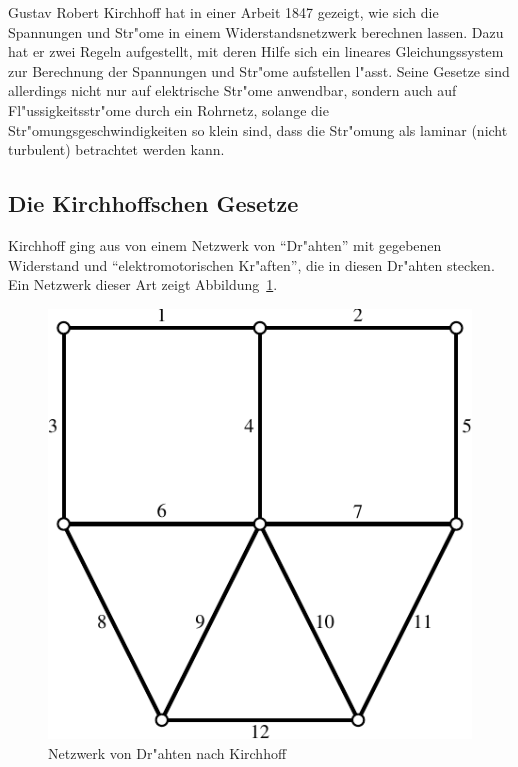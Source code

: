 %
%
Gustav Robert Kirchhoff hat in einer Arbeit 1847 gezeigt, wie sich
die Spannungen und Str"ome in einem Widerstandsnetzwerk berechnen
lassen. Dazu hat er zwei Regeln aufgestellt, mit deren Hilfe
sich ein lineares Gleichungssystem zur Berechnung der Spannungen
und Str"ome aufstellen l"asst.
Seine Gesetze sind allerdings
nicht nur auf elektrische Str"ome anwendbar, sondern auch auf
Fl"ussigkeitsstr"ome durch ein Rohrnetz, solange die
Str"omungsgeschwindigkeiten so klein sind, dass die Str"omung als
laminar (nicht turbulent) betrachtet werden kann.

\subsection{Die Kirchhoffschen Gesetze}
Kirchhoff ging aus von einem Netzwerk von ``Dr"ahten'' mit gegebenen
Widerstand und ``elektromotorischen Kr"aften'', die in diesen
Dr"ahten stecken. Ein Netzwerk dieser Art zeigt
Abbildung~\ref{kirchhoff-netzwerk}.
\begin{figure}
\begin{center}
\includegraphics[width=0.6\hsize]{images/kirchhoff-1}
\end{center}
\caption{Netzwerk von Dr"ahten nach Kirchhoff\label{kirchhoff-netzwerk}}
\end{figure}

